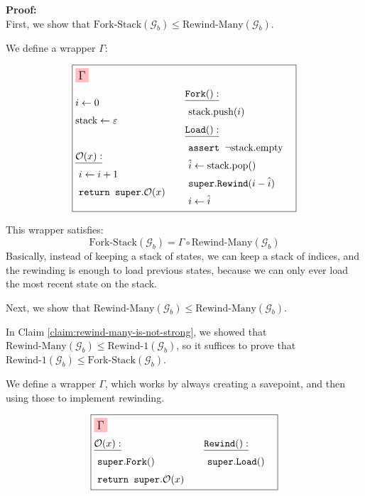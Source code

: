 \textbf{Proof:}\\
First, we show that $\text{Fork-Stack}(\mathcal{G}_b) \leq \text{Rewind-Many}(\mathcal{G}_b)$.

We define a wrapper $\Gamma$:

$$
\boxed{
\begin{aligned}
&\colorbox{pink}{\large $\Gamma$}\cr
&\begin{aligned}
    &i \gets 0\cr
    &\text{stack} \gets \varepsilon\cr
    &\cr
    &\underline{\mathcal{O}(x):}\cr
    &\ i \gets i + 1\cr
    &\ \texttt{return } \texttt{super}.\mathcal{O}(x)\cr
\end{aligned}
&\begin{aligned}
    &\underline{\texttt{Fork}():}\cr
    &\ \text{stack}.\text{push}(i)\cr
    &\underline{\texttt{Load}():}\cr
    &\ \texttt{assert } \neg \text{stack}.\text{empty}\cr
    &\ \hat{i} \gets \text{stack}.\text{pop}()\cr
    &\ \texttt{super}.\texttt{Rewind}(i - \hat{i})\cr
    &\ i \gets \hat{i}\cr
\end{aligned}\cr
\end{aligned}
}
$$

This wrapper satisfies:
$$
\text{Fork-Stack}(\mathcal{G}_b) = \Gamma \circ \text{Rewind-Many}(\mathcal{G}_b)
$$
Basically, instead of keeping a stack of states, we can keep a stack of indices,
and the rewinding is enough to load previous states, because we can only ever load
the most recent state on the stack.

Next, we show that $\text{Rewind-Many}(\mathcal{G}_b) \leq \text{Rewind-Many}(\mathcal{G}_b)$.

In Claim \ref{claim:rewind-many-is-not-strong}, we showed that
$\text{Rewind-Many}(\mathcal{G}_b) \leq \text{Rewind-1}(\mathcal{G}_b)$, so
it suffices to prove that $\text{Rewind-1}(\mathcal{G}_b) \leq \text{Fork-Stack}(\mathcal{G}_b)$.

We define a wrapper $\Gamma$, which works by always creating a savepoint,
and then using those to implement rewinding.

$$
\boxed{
\begin{aligned}
&\colorbox{pink}{\large $\Gamma$}\cr
&\begin{aligned}
    &\underline{\mathcal{O}(x):}\cr
    &\ \texttt{super}.\texttt{Fork}()\cr
    &\ \texttt{return } \texttt{super}.\mathcal{O}(x)\cr
\end{aligned}
&\begin{aligned}
    &\underline{\texttt{Rewind}():}\cr
    &\ \texttt{super}.\texttt{Load}()\cr
    &\cr
\end{aligned}\cr
\end{aligned}
}
$$

